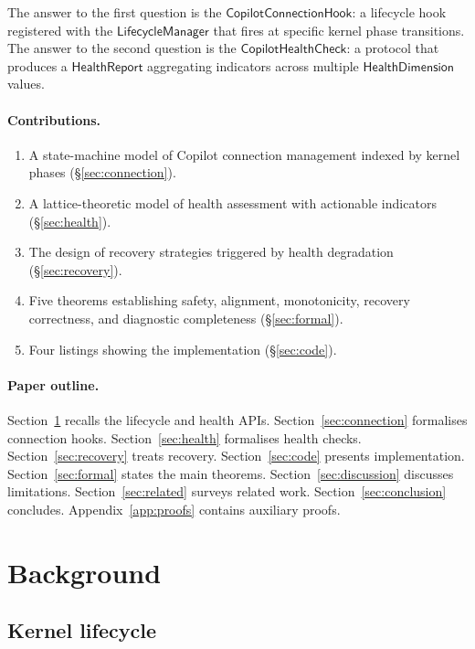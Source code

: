 \documentclass[11pt]{article}
\newcommand{\ConnHook}{\mathsf{CopilotConnectionHook}}
\newcommand{\HealthChk}{\mathsf{CopilotHealthCheck}}
\newcommand{\LifeMgr}{\mathsf{LifecycleManager}}
\newcommand{\HealthRep}{\mathsf{HealthReport}}
\newcommand{\HealthDim}{\mathsf{HealthDimension}}
\begin{document}
The answer to the first question is the $\ConnHook$: a
lifecycle hook registered with the $\LifeMgr$ that fires
at specific kernel phase transitions.  The answer to the
second question is the $\HealthChk$: a protocol that
produces a $\HealthRep$ aggregating indicators across
multiple $\HealthDim$ values.

\paragraph{Contributions.}
\begin{enumerate}
\item A state-machine model of Copilot connection management
      indexed by kernel phases (\S\ref{sec:connection}).
\item A lattice-theoretic model of health assessment with
      actionable indicators (\S\ref{sec:health}).
\item The design of recovery strategies triggered by health
      degradation (\S\ref{sec:recovery}).
\item Five theorems establishing safety, alignment,
      monotonicity, recovery correctness, and diagnostic
      completeness (\S\ref{sec:formal}).
\item Four \Python{} listings showing the implementation
      (\S\ref{sec:code}).
\end{enumerate}

\paragraph{Paper outline.}
Section~\ref{sec:background} recalls the lifecycle and health
APIs.  Section~\ref{sec:connection} formalises connection hooks.
Section~\ref{sec:health} formalises health checks.
Section~\ref{sec:recovery} treats recovery.
Section~\ref{sec:code} presents implementation.
Section~\ref{sec:formal} states the main theorems.
Section~\ref{sec:discussion} discusses limitations.
Section~\ref{sec:related} surveys related work.
Section~\ref{sec:conclusion} concludes.
Appendix~\ref{app:proofs} contains auxiliary proofs.

\section{Background}\label{sec:background}

\subsection{Kernel lifecycle}
\end{document}
